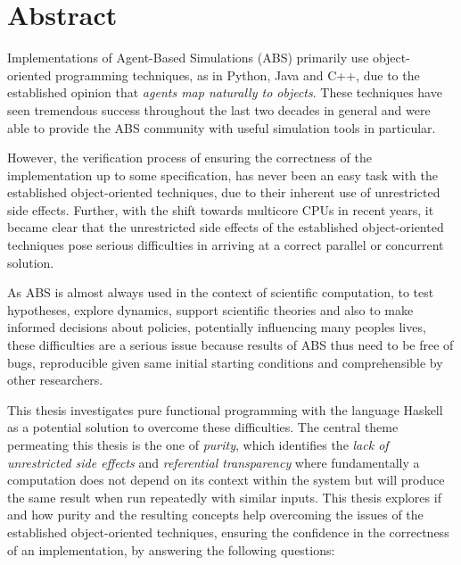 \section*{Abstract}
Implementations of Agent-Based Simulations (ABS) primarily use object- \\ oriented programming techniques, as in Python, Java and C++, due to the established opinion that \textit{agents map naturally to objects}. These techniques have seen tremendous success throughout the last two decades in general and were able to provide the ABS community with useful simulation tools in particular.

However, the verification process of ensuring the correctness of the implementation up to some specification, has never been an easy task with the established object-oriented techniques, due to their inherent use of unrestricted side effects.
Further, with the shift towards multicore CPUs in recent years, it became clear that the unrestricted side effects of the established object-oriented techniques pose serious difficulties in arriving at a correct parallel or concurrent solution.

As ABS is almost always used in the context of scientific computation, to test hypotheses, explore dynamics, support scientific theories and also to make informed decisions about policies, potentially influencing many peoples lives, these difficulties are a serious issue because results of ABS thus need to be free of bugs, reproducible given same initial starting conditions and comprehensible by other researchers.

\medskip

This thesis investigates pure functional programming with the language Haskell as a potential solution to overcome these difficulties. The central theme permeating this thesis is the one of \textit{purity}, which identifies the \textit{lack of unrestricted side effects} and \textit{referential transparency} where fundamentally a computation does not depend on its context within the system but will produce the same result when run repeatedly with similar inputs. This thesis explores if and how purity and the resulting concepts help overcoming the issues of the established object-oriented techniques, ensuring the confidence in the correctness of an implementation, by answering the following questions:

